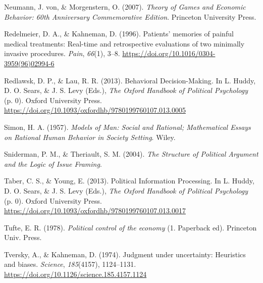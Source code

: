 \documentclass[
]{article}
\newlength{\cslhangindent}
\newlength{\cslentryspacingunit} %
\newenvironment{CSLReferences}[2] %
 {%
  \setlength{\parindent}{0pt}
  \ifodd #1
  \let\oldpar\par
  \def\par{\hangindent=\cslhangindent\oldpar}
  \fi
  \setlength{\parskip}{#2\cslentryspacingunit}
 }%
 {}
\begin{document}
\begin{CSLReferences}{1}{0}
\leavevmode{}%
Neumann, J. von, \& Morgenstern, O. (2007). \emph{Theory of {Games} and
{Economic Behavior}: 60th {Anniversary Commemorative Edition}}.
{Princeton University Press}.

\leavevmode{}%
Redelmeier, D. A., \& Kahneman, D. (1996). Patients' memories of painful
medical treatments: Real-time and retrospective evaluations of two
minimally invasive procedures. \emph{Pain}, \emph{66}(1), 3--8.
\url{https://doi.org/10.1016/0304-3959(96)02994-6}

\leavevmode{}%
Redlawsk, D. P., \& Lau, R. R. (2013). Behavioral {Decision-Making}. In
L. Huddy, D. O. Sears, \& J. S. Levy (Eds.), \emph{The {Oxford Handbook}
of {Political Psychology}} (p. 0). {Oxford University Press}.
\url{https://doi.org/10.1093/oxfordhb/9780199760107.013.0005}

\leavevmode{}%
Simon, H. A. (1957). \emph{Models of {Man}: {Social} and {Rational};
{Mathematical Essays} on {Rational Human Behavior} in {Society
Setting}}. {Wiley}.

\leavevmode{}%
Sniderman, P. M., \& Theriault, S. M. (2004). \emph{The {Structure} of
{Political Argument} and the {Logic} of {Issue Framing}}.

\leavevmode{}%
Taber, C. S., \& Young, E. (2013). Political {Information Processing}.
In L. Huddy, D. O. Sears, \& J. S. Levy (Eds.), \emph{The {Oxford
Handbook} of {Political Psychology}} (p. 0). {Oxford University Press}.
\url{https://doi.org/10.1093/oxfordhb/9780199760107.013.0017}

\leavevmode{}%
Tufte, E. R. (1978). \emph{Political control of the economy} (1.
Paperback ed). {Princeton Univ. Press}.

\leavevmode{}%
Tversky, A., \& Kahneman, D. (1974). Judgment under uncertainty:
{Heuristics} and biases. \emph{Science}, \emph{185}(4157), 1124--1131.
\url{https://doi.org/10.1126/science.185.4157.1124}

\end{CSLReferences}
\end{document}
